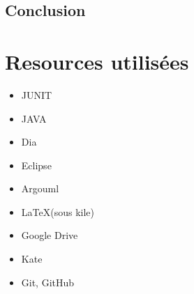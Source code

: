 ﻿\documentclass[a4paper,twoside,12pt]{report}
\begin{document}
\section{Conclusion}
%
\newpage
{}


\chapter{Resources utilisées}
\begin{itemize}
 \item JUNIT
 \item JAVA
 \item Dia
 \item Eclipse
 \item Argouml
 \item \LaTeX (sous kile)
 \item Google Drive
 \item Kate
 \item Git, GitHub
\end{itemize}
\end{document}
